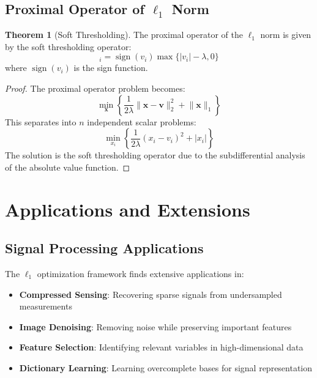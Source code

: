 \documentclass[12pt]{article}
\renewcommand{\vec}[1]{\mathbf{#1}}
\DeclareMathOperator{\sign}{sign}
\DeclareMathOperator{\prox}{prox}
\newcommand{\norm}[1]{\lVert#1\rVert}
\theoremstyle{definition}
\newtheorem{theorem}{Theorem}[section]
\begin{document}
\subsection{Proximal Operator of $\ell_1$ Norm}

\begin{theorem}[Soft Thresholding]
    The proximal operator of the $\ell_1$ norm is given by the soft thresholding operator:
    \begin{equation}
        [\prox_{\lambda \norm{\cdot}_1}(\vec{v})]_i = \sign(v_i) \max\{|v_i| - \lambda, 0\}
    \end{equation}
    where $\sign(v_i)$ is the sign function.
\end{theorem}

\begin{proof}
    The proximal operator problem becomes:
    \begin{equation}
        \min_{\vec{x}} \left\{\frac{1}{2\lambda}\norm{\vec{x} - \vec{v}}_2^2 + \norm{\vec{x}}_1\right\}
    \end{equation}
    This separates into $n$ independent scalar problems:
    \begin{equation}
        \min_{x_i} \left\{\frac{1}{2\lambda}(x_i - v_i)^2 + |x_i|\right\}
    \end{equation}
    The solution is the soft thresholding operator due to the subdifferential analysis of the absolute value function.
\end{proof}

\newpage

\section{Applications and Extensions}

\subsection{Signal Processing Applications}

The $\ell_1$ optimization framework finds extensive applications in:

\begin{itemize}
    \item \textbf{Compressed Sensing}: Recovering sparse signals from undersampled measurements
    \item \textbf{Image Denoising}: Removing noise while preserving important features
    \item \textbf{Feature Selection}: Identifying relevant variables in high-dimensional data
    \item \textbf{Dictionary Learning}: Learning overcomplete bases for signal representation
\end{itemize}
\end{document}
